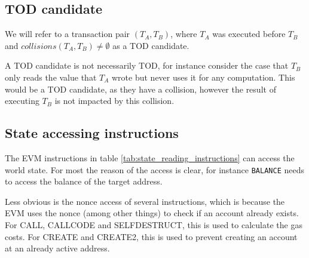 \documentclass[draft,final]{vutinfth} %
\begin{document}
\subsection{TOD candidate}

We will refer to a transaction pair $(T_A, T_B)$, where $T_A$ was executed before $T_B$ and $collisions(T_A, T_B) \neq \emptyset$ as a TOD candidate.

A TOD candidate is not necessarily TOD, for instance consider the case that $T_B$ only reads the value that $T_A$ wrote but never uses it for any computation. This would be a TOD candidate, as they have a collision, however the result of executing $T_B$ is not impacted by this collision.


\subsection{State accessing instructions}

The EVM instructions in table \ref{tab:state_reading_instructions} can access the world state. For most the reason of the access is clear, for instance \verb|BALANCE| needs to access the balance of the target address.

Less obvious is the nonce access of several instructions, which is because the EVM uses the nonce (among other things) to check if an account already exists. For CALL, CALLCODE and SELFDESTRUCT, this is used to calculate the gas costs. For CREATE and CREATE2, this is used to prevent creating an account at an already active address. \cite{wood_ethereum_2014}
\end{document}
